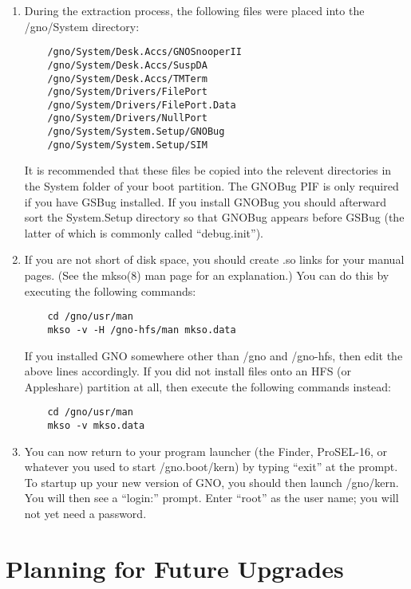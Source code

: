 \documentclass{report}
\begin{document}
\begin{enumerate}
\item
During the extraction process, the following files were placed
into the /gno/System directory:

\begin{verbatim}
	/gno/System/Desk.Accs/GNOSnooperII
	/gno/System/Desk.Accs/SuspDA
	/gno/System/Desk.Accs/TMTerm
	/gno/System/Drivers/FilePort
	/gno/System/Drivers/FilePort.Data
	/gno/System/Drivers/NullPort
	/gno/System/System.Setup/GNOBug
	/gno/System/System.Setup/SIM
\end{verbatim}

It is recommended that these files be copied into the relevent
directories in the System folder of your boot partition.  The
GNOBug PIF is only required if you have GSBug installed.  If
you install GNOBug you should afterward sort the System.Setup
directory so that GNOBug appears before GSBug (the latter of
which is commonly called ``debug.init'').

\item
If you are not short of disk space, you should create .so links
for your manual pages.  (See the mkso(8) man page for an
explanation.)  You can do this by executing the following
commands:

\begin{verbatim}
	cd /gno/usr/man
	mkso -v -H /gno-hfs/man mkso.data
\end{verbatim}

If you installed GNO somewhere other than /gno and /gno-hfs, then
edit the above lines accordingly.  If you did not install files
onto an HFS (or Appleshare) partition at all, then execute the
following commands instead:

\begin{verbatim}
	cd /gno/usr/man
	mkso -v mkso.data
\end{verbatim}

\item
You can now return to your program launcher (the Finder,
ProSEL-16, or whatever you used to start /gno.boot/kern) by
typing ``exit'' at the prompt.  To startup up your new version
of GNO, you should then launch /gno/kern.  You will then see
a ``login:'' prompt.  Enter ``root'' as the user name; you will
not yet need a password.


\end{enumerate}

\section{Planning for Future Upgrades}
\end{document}
